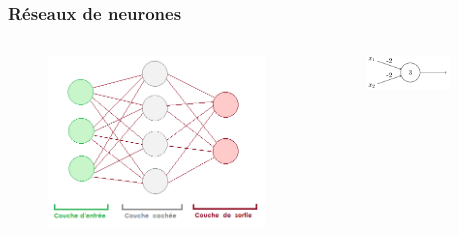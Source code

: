 \documentclass{beamer}
\begin{document}
\begin{frame}
    \frametitle{Réseaux de neurones}
    \begin{columns}[c]
        \begin{column}{.48\textwidth}
            \begin{figure}
                \includegraphics[width=\textwidth]{neuralnet.png}
            \end{figure}
        \end{column}
        \begin{column}{.48\textwidth}
            \begin{figure}
                \includegraphics[width=0.8\textwidth]{neuron.png}
            \end{figure}
        \end{column}
    \end{columns}
\end{frame}
\end{document}
